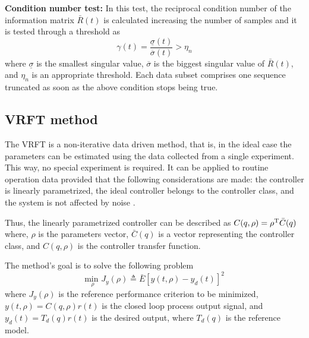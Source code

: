 \textbf{Condition number test:} In this test, the reciprocal condition number of the information matrix $\bar{R}(t)$ is calculated increasing the number of samples and it is tested through a threshold as
\begin{equation}
	\gamma(t) = \frac{\underline{\sigma}(t)}{\overline{\sigma}(t)} > \eta_n
\label{eq:cond_number}
\end{equation}
where $\underline{\sigma}$ is the smallest singular value, $\overline{\sigma}$ is the biggest singular value of $\bar{R}(t)$, and $\eta_n$ is an appropriate threshold.
Each data subset comprises one sequence truncated as soon as the above condition stops being true.


\subsection{\label{sub:vrft} VRFT method}
The VRFT is a non-iterative data driven method, that is, in the ideal case the parameters can be estimated using the data collected from a single experiment.
This way, no special experiment is required.
It can be applied to routine operation data provided that the following considerations are made: the controller is linearly parametrized, the ideal controller belongs to the controller class, and the system is not affected by noise \cite{bazanella2011data}.

Thus, the linearly parametrized controller can be described as $ C(q, \rho) = \rho^\text{T} \bar{C}(q)$
where, $\rho$ is the parameters vector, $\bar{C}(q)$ is a vector representing the controller class, and $C(q, \rho)$ is the controller transfer function.

The method's goal is to solve the following problem
\begin{equation}
	\underset{\rho}{\text{min }} J_y(\rho) \triangleq \bar{E} \left[ y(t, \rho) - y_d(t)  \right]^2
\label{eq:cost_jy}
\end{equation}
where $J_y(\rho)$ is the reference performance criterion to be minimized, $y(t, \rho) = C(q, \rho) r(t)$ is the closed loop process output signal, and $y_d(t) = T_d(q)r(t)$ is the desired output, where $T_d(q)$ is the reference model.

